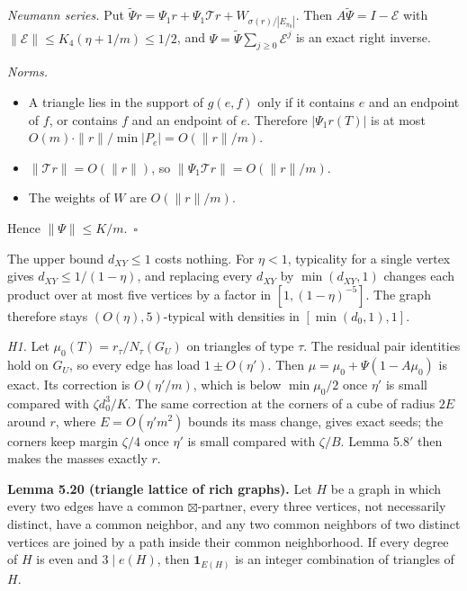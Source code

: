\documentclass[english,11pt,a4paper]{article}
\providecommand{\tightlist}{\setlength{\itemsep}{0pt}\setlength{\parskip}{0pt}}
\begin{document}
\emph{Neumann series.} Put \(\tilde\Psi r=\Psi_1r+\Psi_1\mathcal Tr+W_{\sigma(r)/|E_{\pi_0}|}\). Then \(A\tilde\Psi=I-\mathcal E\) with \(\|\mathcal E\|\le K_4(\eta+1/m)\le1/2\), and \(\Psi=\tilde\Psi\sum_{j\ge0}\mathcal E^j\) is an exact right inverse.

\emph{Norms.}

\begin{itemize}
\tightlist
\item
  A triangle lies in the support of \(g(e,f)\) only if it contains \(e\) and an endpoint of \(f\), or contains \(f\) and an endpoint of \(e\). Therefore \(|\Psi_1r(T)|\) is at most \(O(m)\cdot\|r\|/\min|P_e|=O(\|r\|/m)\).
\item
  \(\|\mathcal Tr\|=O(\|r\|)\), so \(\|\Psi_1\mathcal Tr\|=O(\|r\|/m)\).
\item
  The weights of \(W\) are \(O(\|r\|/m)\).
\end{itemize}

Hence \(\|\Psi\|\le K/m\).~\(\square\)

The upper bound \(d_{XY}\le1\) costs nothing. For \(\eta<1\), typicality for a single vertex gives \(d_{XY}\le1/(1-\eta)\), and replacing every \(d_{XY}\) by \(\min(d_{XY},1)\) changes each product over at most five vertices by a factor in \([1,(1-\eta)^{-5}]\). The graph therefore stays \((O(\eta),5)\)-typical with densities in \([\min(d_0,1),1]\).

\emph{H1.} Let \(\mu_0(T)=r_\tau/N_\tau(G_U)\) on triangles of type \(\tau\). The residual pair identities hold on \(G_U\), so every edge has load \(1\pm O(\eta')\). Then \(\mu=\mu_0+\Psi(1-A\mu_0)\) is exact. Its correction is \(O(\eta'/m)\), which is below \(\min\mu_0/2\) once \(\eta'\) is small compared with \(\zeta d_0^3/K\). The same correction at the corners of a cube of radius \(2E\) around \(r\), where \(E=O(\eta'm^2)\) bounds its mass change, gives exact seeds; the corners keep margin \(\zeta/4\) once \(\eta'\) is small compared with \(\zeta/B\). Lemma 5.8\('\) then makes the masses exactly \(r\).

\textbf{Lemma 5.20 (triangle lattice of rich graphs).} Let \(H\) be a graph in which every two edges have a common \(\boxtimes\)-partner, every three vertices, not necessarily distinct, have a common neighbor, and any two common neighbors of two distinct vertices are joined by a path inside their common neighborhood. If every degree of \(H\) is even and \(3\mid e(H)\), then \(\mathbf 1_{E(H)}\) is an integer combination of triangles of \(H\).
\end{document}
